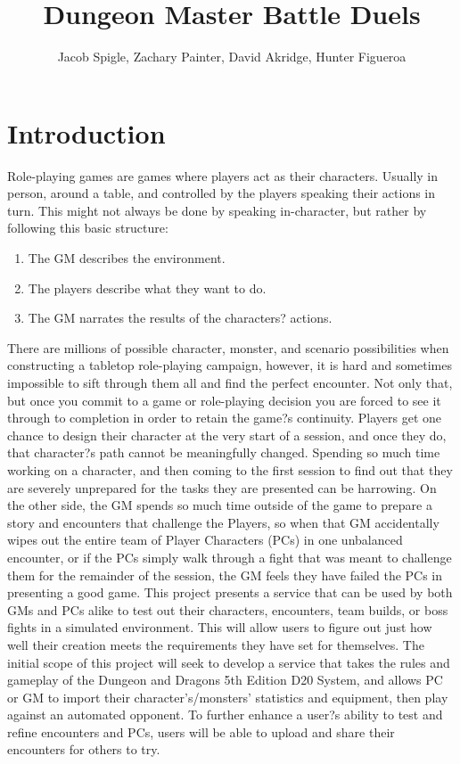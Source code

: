 \documentclass[12pt,a4paper]{report}
\author{Jacob Spigle, Zachary Painter, David Akridge, Hunter Figueroa}
\title{Dungeon Master Battle Duels}
\begin{document}
	
\maketitle

\tableofcontents
	
\newpage
\chapter*{Introduction}

Role-playing games are games where players act as their characters. Usually in person, around a table, and controlled by the players speaking their actions in turn. This might not always be done by speaking in-character, but rather by following this basic structure:

\begin{enumerate}
	\item The GM describes the environment.
	\item The players describe what they want to do.
	\item The GM narrates the results of the characters? actions.
\end{enumerate}

There are millions of possible character, monster, and scenario possibilities when constructing a tabletop role-playing campaign, however, it is hard and sometimes impossible to sift through them all and find the perfect encounter. Not only that,  but once you commit to a game or role-playing decision you are forced to see it through to completion in order to retain the game?s continuity. Players get one chance to design their character at the very start of a session, and once they do, that character?s path cannot be meaningfully changed. Spending so much time working on a character, and then coming to the first session to find out that they are severely unprepared for the tasks they are presented can be harrowing. On the other side, the GM spends so much time outside of the game to prepare a story and encounters that challenge the Players, so when that GM accidentally wipes out the entire team of Player Characters (PCs) in one unbalanced encounter, or if the PCs simply walk through a fight that was meant to challenge them for the remainder of the session, the GM feels they have failed the PCs in presenting a good game. 
This project presents a service that can be used by both GMs and PCs alike to test out their characters, encounters, team builds, or boss fights in a simulated environment. This will allow users to figure out just how well their creation meets the requirements they have set for themselves. The initial scope of this project will seek to develop a service that takes the rules and gameplay of the Dungeon and Dragons 5th Edition D20 System, and allows PC or GM to import their character's/monsters' statistics and equipment, then play against an automated opponent. To further enhance a user?s ability to test and refine encounters and PCs, users will be able to upload and share their encounters for others to try.
\end{document}
